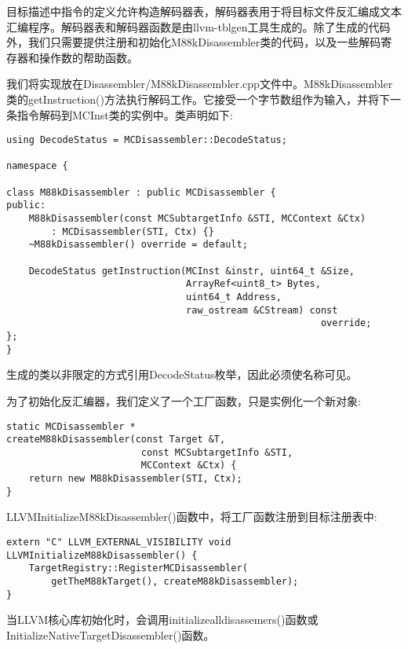 目标描述中指令的定义允许构造解码器表，解码器表用于将目标文件反汇编成文本汇编程序。解码器表和解码器函数是由llvm-tblgen工具生成的。除了生成的代码外，我们只需要提供注册和初始化M88kDisassembler类的代码，以及一些解码寄存器和操作数的帮助函数。\par

我们将实现放在Disassembler/M88kDisassembler.cpp文件中。M88kDisassembler类的getInstruction()方法执行解码工作。它接受一个字节数组作为输入，并将下一条指令解码到MCInst类的实例中。类声明如下:\par

\begin{lstlisting}[caption={}]
using DecodeStatus = MCDisassembler::DecodeStatus;

namespace {
	
class M88kDisassembler : public MCDisassembler {
public:
	M88kDisassembler(const MCSubtargetInfo &STI, MCContext &Ctx)
		: MCDisassembler(STI, Ctx) {}
	~M88kDisassembler() override = default;
	
	DecodeStatus getInstruction(MCInst &instr, uint64_t &Size,
								ArrayRef<uint8_t> Bytes,
								uint64_t Address,
								raw_ostream &CStream) const
														override;
};
}
\end{lstlisting}

生成的类以非限定的方式引用DecodeStatus枚举，因此必须使名称可见。\par

为了初始化反汇编器，我们定义了一个工厂函数，只是实例化一个新对象:\par

\begin{lstlisting}[caption={}]
static MCDisassembler *
createM88kDisassembler(const Target &T,
						const MCSubtargetInfo &STI,
						MCContext &Ctx) {
	return new M88kDisassembler(STI, Ctx);
}
\end{lstlisting}

LLVMInitializeM88kDisassembler()函数中，将工厂函数注册到目标注册表中:\par

\begin{lstlisting}[caption={}]
extern "C" LLVM_EXTERNAL_VISIBILITY void
LLVMInitializeM88kDisassembler() {
	TargetRegistry::RegisterMCDisassembler(
		getTheM88kTarget(), createM88kDisassembler);
}
\end{lstlisting}

当LLVM核心库初始化时，会调用initializealldisassemers()函数或InitializeNativeTargetDisassembler()函数。\par

